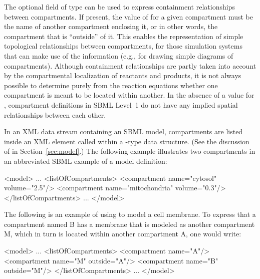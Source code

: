 \documentclass[10pt]{cekarticle}
\newenvironment{blockChanged}{\color{BrickRed}}{}
\begin{document}
The optional field  of type  can be used to
express containment relationships between compartments.  If present, the
value of  for a given compartment
\begin{blockChanged}
must be the name of
another compartment enclosing it, or in other words, the compartment that
is ``outside'' of it.  This enables the representation of simple
topological relationships between compartments, for those simulation
systems that can make use of the information (e.g., for drawing simple
diagrams of compartments).  Although containment relationships are partly
taken into account by the compartmental localization of reactants and
products, it is not always
\end{blockChanged}
\begin{blockChanged} possible to determine purely from the reaction
equations whether one compartment is meant to be located within another.
In the absence of a value for , compartment definitions in
SBML Level~1 do not have any implied spatial relationships between each
other.
\end{blockChanged}

In an XML data stream containing an SBML model, compartments are listed
inside an XML element called  within a
-type data structure.  (See the discussion of  in
Section~\ref{sec:model}.)  The following example illustrates two
compartments in an abbreviated SBML example of a model definition:
\begin{example}
<model>
    ...
    <listOfCompartments>
        <compartment name="cytosol" volume="2.5"/>
        <compartment name="mitochondria" volume="0.3"/>
    </listOfCompartments>
    ...
</model>
\end{example}

\begin{blockChanged}
The following is an example of using  to model a cell
membrane.  To express that a compartment named B has a membrane that is
modeled as another compartment M, which in turn is located within another
compartment A, one would write:
\end{blockChanged}
\begin{example}
<model>
    ...
    <listOfCompartments>
        <compartment name="A"/>
        <compartment name="M" outside="A"/>
        <compartment name="B" outside="M"/>
    </listOfCompartments>
    ...
</model>
\end{example}
\end{document}
